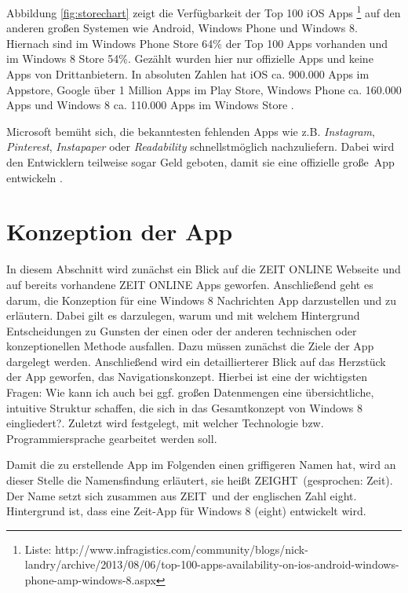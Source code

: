 \documentclass[12pt,a4paper,bibtotoc,abstracton]{scrartcl}
\begin{document}
Abbildung \ref{fig:storechart} zeigt die Verfügbarkeit der Top 100 iOS Apps \footnote{Liste: http://www.infragistics.com/community/blogs/nick-landry/archive/2013/08/06/top-100-apps-availability-on-ios-android-windows-phone-amp-windows-8.aspx} auf den anderen großen Systemen wie Android, Windows Phone und Windows 8. Hiernach sind im Windows Phone Store 64\% der Top 100 Apps vorhanden und im Windows 8 Store 54\%. Gezählt wurden hier nur offizielle Apps und keine Apps von Drittanbietern. In absoluten Zahlen hat iOS ca. 900.000 Apps im Appstore, Google über 1 Million Apps im Play Store, Windows Phone ca. 160.000 Apps und Windows 8 ca. 110.000 Apps im Windows Store \citep{WinbetaStore2013}.

Microsoft bemüht sich, die bekanntesten fehlenden Apps wie z.B. \textit{Instagram}, \textit{Pinterest}, \textit{Instapaper} oder \textit{Readability} schnellstmöglich nachzuliefern. Dabei wird den Entwicklern teilweise sogar Geld geboten, damit sie eine offizielle \glqq große\grqq\ App entwickeln \citep{WinbetaStore2013}.

\newpage
\section{Konzeption der App}
\label{sec:konzeption}
In diesem Abschnitt wird zunächst ein Blick auf die ZEIT ONLINE Webseite und auf bereits vorhandene ZEIT ONLINE Apps geworfen. Anschließend geht es darum, die Konzeption für eine Windows 8 Nachrichten App darzustellen und zu erläutern. Dabei gilt es darzulegen, warum und mit welchem Hintergrund Entscheidungen zu Gunsten der einen oder der anderen technischen oder konzeptionellen Methode ausfallen. Dazu müssen zunächst die Ziele der App dargelegt werden. Anschließend wird ein detaillierterer Blick auf das Herzstück der App geworfen, das Navigationskonzept. Hierbei ist eine der wichtigsten Fragen: \glqq Wie kann ich auch bei ggf. großen Datenmengen eine übersichtliche, intuitive Struktur schaffen, die sich in das Gesamtkonzept von Windows 8 eingliedert?\grqq. Zuletzt wird festgelegt, mit welcher Technologie bzw. Programmiersprache gearbeitet werden soll. 

Damit die zu erstellende App im Folgenden einen griffigeren Namen hat, wird an dieser Stelle die Namensfindung erläutert, sie heißt \glqq ZEIGHT\grqq\ (gesprochen: Zeit). Der Name setzt sich zusammen aus \glqq ZEIT\grqq\ und der englischen Zahl \glqq eight\grqq. Hintergrund ist, dass eine \glqq Zeit\grqq-App für Windows 8 (eight) entwickelt wird.
\end{document}
